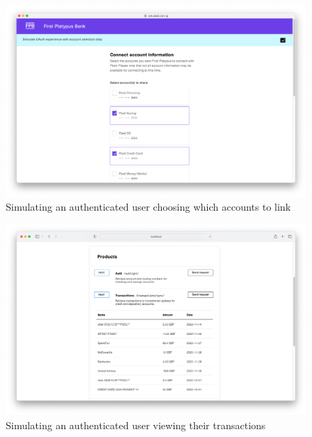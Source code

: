 \begin{figure}[H]
	\centering
    \includegraphics[scale=0.53]{account_choice.png}
	\vspace{-0.8cm}
    \caption{Simulating an authenticated user choosing which accounts to link}
    \label{fig:account_choice}
\end{figure}

\begin{figure}[H]
	\centering
    \includegraphics[scale=0.53]{transactions.png}
	\vspace{-0.8cm}
    \caption{Simulating an authenticated user viewing their transactions}
    \label{fig:transactions}
\end{figure}

